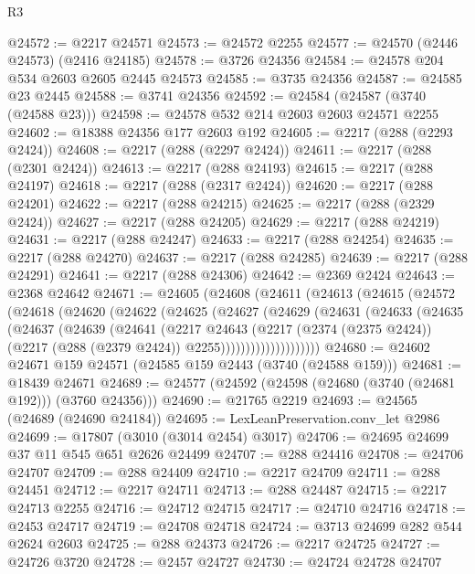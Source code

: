 \begin{lexlean}{R3}
\begin{coremodule}
@24572 := @2217 @24571
@24573 := @24572 @2255
@24577 := @24570 (@2446 @24573) (@2416 @24185)
@24578 := @3726 @24356
@24584 := @24578 @204 @534 @2603 @2605 @2445 @24573
@24585 := @3735 @24356
@24587 := @24585 @23 @2445
@24588 := @3741 @24356
@24592 := @24584 (@24587 (@3740 (@24588 @23)))
@24598 := @24578 @532 @214 @2603 @2603 @24571 @2255
@24602 := @18388 @24356 @177 @2603 @192
@24605 := @2217 (@288 (@2293 @2424))
@24608 := @2217 (@288 (@2297 @2424))
@24611 := @2217 (@288 (@2301 @2424))
@24613 := @2217 (@288 @24193)
@24615 := @2217 (@288 @24197)
@24618 := @2217 (@288 (@2317 @2424))
@24620 := @2217 (@288 @24201)
@24622 := @2217 (@288 @24215)
@24625 := @2217 (@288 (@2329 @2424))
@24627 := @2217 (@288 @24205)
@24629 := @2217 (@288 @24219)
@24631 := @2217 (@288 @24247)
@24633 := @2217 (@288 @24254)
@24635 := @2217 (@288 @24270)
@24637 := @2217 (@288 @24285)
@24639 := @2217 (@288 @24291)
@24641 := @2217 (@288 @24306)
@24642 := @2369 @2424
@24643 := @2368 @24642
@24671 := @24605
    (@24608
      (@24611
        (@24613
          (@24615
            (@24572
              (@24618
                (@24620
                  (@24622
                    (@24625
                      (@24627
                        (@24629
                          (@24631
                            (@24633
                              (@24635
                                (@24637
                                  (@24639
                                    (@24641
                                      (@2217
                                        @24643
                                        (@2217
                                          (@2374 (@2375 @2424))
                                          (@2217 (@288 (@2379 @2424)) @2255))))))))))))))))))))
@24680 := @24602 @24671 @159 @24571 (@24585 @159 @2443 (@3740 (@24588 @159)))
@24681 := @18439 @24671
@24689 := @24577 (@24592 (@24598 (@24680 (@3740 (@24681 @192))) (@3760 @24356)))
@24690 := @21765 @2219
@24693 := @24565 (@24689 (@24690 @24184))
@24695 := LexLeanPreservation.conv_let @2986
@24699 := @17807 (@3010 (@3014 @2454) @3017)
@24706 := @24695 @24699 @37 @11 @545 @651 @2626 @24499
@24707 := @288 @24416
@24708 := @24706 @24707
@24709 := @288 @24409
@24710 := @2217 @24709
@24711 := @288 @24451
@24712 := @2217 @24711
@24713 := @288 @24487
@24715 := @2217 @24713 @2255
@24716 := @24712 @24715
@24717 := @24710 @24716
@24718 := @2453 @24717
@24719 := @24708 @24718
@24724 := @3713 @24699 @282 @544 @2624 @2603
@24725 := @288 @24373
@24726 := @2217 @24725
@24727 := @24726 @3720
@24728 := @2457 @24727
@24730 := @24724 @24728 @24707

\end{coremodule}
\end{lexlean}
